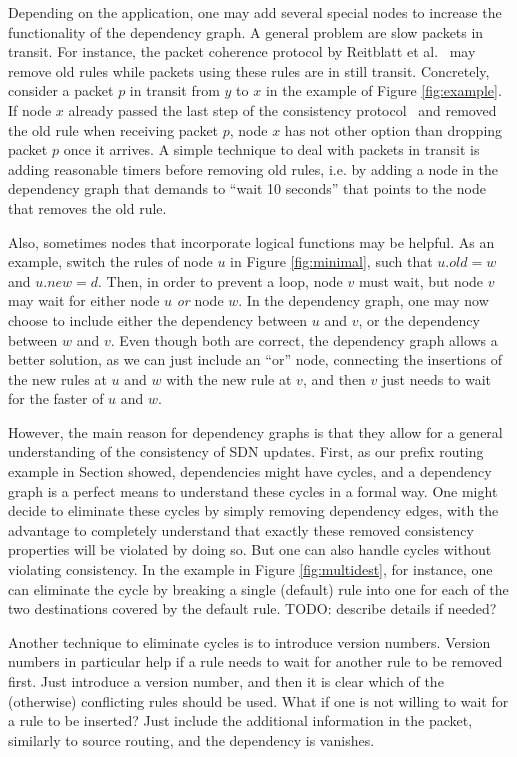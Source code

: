 Depending on the application, one may add several special nodes to increase the functionality of the dependency graph. A general problem are slow packets in transit. For instance, the packet coherence protocol by Reitblatt et al.~\cite{safeupdate} may remove old rules while packets using these rules are in still transit. Concretely, consider a packet $p$ in transit from $y$ to $x$ in the example of Figure \ref{fig:example}. If node $x$ already passed the last step of the consistency protocol~\cite{safeupdate} and removed the old rule when receiving packet $p$, node $x$ has not other option than dropping packet $p$ once it arrives. A simple technique to deal with packets in transit is adding reasonable timers before removing old rules, i.e. by adding a node in the dependency graph that demands to ``wait 10 seconds'' that points to the node that removes the old rule.

Also, sometimes nodes that incorporate logical functions may be helpful. As an example, switch the rules of node $u$ in Figure \ref{fig:minimal}, such that $u.old = w$ and $u.new = d$. Then, in order to prevent a loop, node $v$ must wait, but node $v$ may wait for either node $u$ \emph{or} node $w$. In the dependency graph, one may now choose to include either the dependency between $u$ and $v$, or the dependency between $w$ and $v$. Even though both are correct, the dependency graph allows a better solution, as we can just include an ``or'' node, connecting the insertions of the new rules at $u$ and $w$ with the new rule at $v$, and then $v$ just needs to wait for the faster of $u$ and $w$.

However, the main reason for dependency graphs is that they allow for a general understanding of the consistency of SDN updates. First, as our prefix routing example in Section \label{ref:multidest} showed, dependencies might have cycles, and a dependency graph is a perfect means to understand these cycles in a formal way. One might decide to eliminate these cycles by simply removing dependency edges, with the advantage to completely understand that exactly these removed consistency properties will be violated by doing so. But one can also handle cycles without violating consistency. In the example in Figure \ref{fig:multidest}, for instance, one can eliminate the cycle by breaking a single (default) rule into one for each of the two destinations covered by the default rule. TODO: describe details if needed?

Another technique to eliminate cycles is to introduce version numbers. Version numbers in particular help if a rule needs to wait for another rule to be removed first. Just introduce a version number, and then it is clear which of the (otherwise) conflicting rules should be used. What if one is not willing to wait for a rule to be inserted? Just include the additional information in the packet, similarly to source routing, and the dependency is vanishes.

